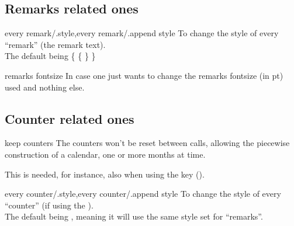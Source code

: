 \documentclass{article}
\begin{document}
%
\subsection{Remarks related ones}
\begin{codedescribe}[key]{every remark/.style,every remark/.append style}
To change the style of every ``remark'' (the remark text).\\ The default being \{  \{  \} \}
\end{codedescribe}

%
\begin{codedescribe}[key]{remarks fontsize}
In case one just wants to change the remarks fontsize (in pt) used and nothing else.
\end{codedescribe}


\subsection{Counter related ones}\label{style:counters}
\begin{codedescribe}[key]{keep counters}
The counters won't be reset between calls, allowing the piecewise construction of a calendar, one or more months at time.
\end{codedescribe}
\begin{tsremark} 
This is needed, for instance, also when using the  key (\tsobj{\setcountingweeks}).
\end{tsremark}

\begin{codedescribe}[key]{every counter/.style,every counter/.append style}
To change the style of every ``counter'' (if using the \tsobj{\setcntweek}).\\ The default being , meaning it will use the same style set for ``remarks''.
\end{codedescribe}
\end{document}

